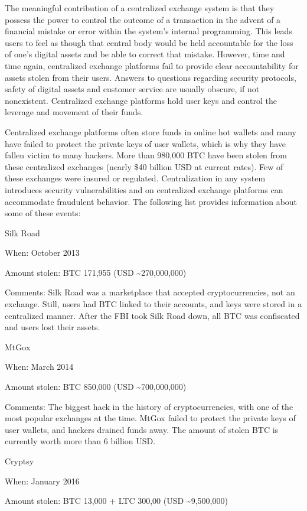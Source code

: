 \documentclass[11pt]{article}
\begin{document}
The meaningful contribution of a centralized exchange system is that they possess the power to control the outcome of a transaction in the advent of a financial  mistake or error within the system's internal programming. This leads users to feel as though that central body would be held accountable for the loss of one's digital assets and be able to correct that mistake. However, time and time again, centralized exchange platforms fail to provide clear accountability for assets stolen from their users. Answers to questions regarding security protocols, safety of digital assets and customer service are usually obscure, if not nonexistent. Centralized exchange platforms hold user keys and control the leverage and movement of their funds.


Centralized exchange platforms often store funds in online hot wallets and many have failed to protect the private keys of user wallets, which is why they have fallen victim to many hackers. More than 980,000 BTC have been stolen from these centralized exchanges (nearly \$40 billion USD at current rates). Few of these exchanges were insured or regulated. Centralization in any system introduces security vulnerabilities and on centralized exchange platforms can accommodate fraudulent behavior. The following list provides information about some of these events:


Silk Road


When: October 2013


Amount stolen: BTC 171,955 (USD \textasciitilde{}270,000,000)


Comments: Silk Road was a marketplace that accepted cryptocurrencies, not an exchange. Still, users had BTC linked to their accounts, and keys were stored in a centralized manner. After the FBI took Silk Road down, all BTC was confiscated and users lost their assets.


MtGox


When: March 2014


Amount stolen: BTC 850,000 (USD \textasciitilde{}700,000,000)


Comments: The biggest hack in the history of cryptocurrencies, with one of the most popular exchanges at the time. MtGox failed to protect the private keys of user wallets, and hackers drained funds away. The amount of stolen BTC is currently worth more than 6 billion USD.


Cryptsy


When: January 2016


Amount stolen: BTC 13,000 + LTC 300,00 (USD \textasciitilde{}9,500,000)
\end{document}
